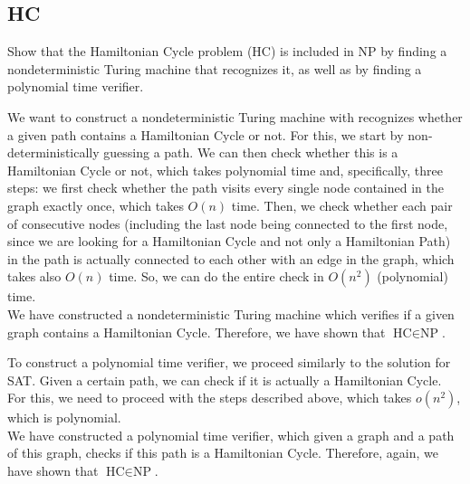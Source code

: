 \subsection{HC}

Show that the Hamiltonian Cycle problem (\textsc{HC}) is included in \textsc{NP} by finding a nondeterministic Turing machine that recognizes it, as well as by finding a polynomial time verifier.

We want to construct a nondeterministic Turing machine with recognizes whether a given path contains a Hamiltonian Cycle or not. For this, we start by non-deterministically guessing a path. We can then check whether this is a Hamiltonian Cycle or not, which takes polynomial time and, specifically, three steps: we first check whether the path visits every single node contained in the graph exactly once, which takes $O(n)$ time. Then, we check whether each pair of consecutive nodes (including the last node being connected to the first node, since we are looking for a Hamiltonian Cycle and not only a Hamiltonian Path) in the path is actually connected to each other with an edge in the graph, which takes also $O(n)$ time. So, we can do the entire check in $O(n^{2})$ (polynomial) time.\\
We have constructed a nondeterministic Turing machine which verifies if a given graph contains a Hamiltonian Cycle. Therefore, we have shown that $\text{HC} \in \text{NP}$.

To construct a polynomial time verifier, we proceed similarly to the solution for SAT. Given a certain path, we can check if it is actually a Hamiltonian Cycle. For this, we need to proceed with the steps described above, which takes $o(n^{2})$, which is polynomial.\\
We have constructed a polynomial time verifier, which given a graph and a path of this graph, checks if this path is a Hamiltonian Cycle. Therefore, again, we have shown that $\text{HC} \in \text{NP}$.




